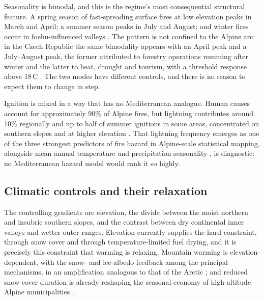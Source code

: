 \documentclass[11pt,a4paper]{article}
\begin{document}
Seasonality is bimodal, and this is the regime's most consequential structural feature. A spring season of fast-spreading surface fires at low elevation peaks in March and April; a summer season peaks in July and August; and winter fires occur in foehn-influenced valleys \citep{valese_wildfires_2011, muller_forest_2020}. The pattern is not confined to the Alpine arc: in the Czech Republic the same bimodality appears with an April peak and a July--August peak, the former attributed to forestry operations resuming after winter and the latter to heat, drought and tourism, with a threshold response above 18\,\degree C \citep{bercak_combination_2024}. The two modes have different controls, and there is no reason to expect them to change in step.

Ignition is mixed in a way that has no Mediterranean analogue. Human causes account for approximately 90\% of Alpine fires, but lightning contributes around 10\% regionally and up to half of summer ignitions in some areas, concentrated on southern slopes and at higher elevation \citep{muller_forest_2020, valese_wildfires_2011}. That lightning frequency emerges as one of the three strongest predictors of fire hazard in Alpine-scale statistical mapping, alongside mean annual temperature and precipitation seasonality \citep{gerberding_mapping_2025}, is diagnostic: no Mediterranean hazard model would rank it so highly.

\subsection{Climatic controls and their relaxation}

The controlling gradients are elevation, the divide between the moist northern and insubric southern slopes, and the contrast between dry continental inner valleys and wetter outer ranges. Elevation currently supplies the hard constraint, through snow cover and through temperature-limited fuel drying, and it is precisely this constraint that warming is relaxing. Mountain warming is elevation-dependent, with the snow- and ice-albedo feedback among the principal mechanisms, in an amplification analogous to that of the Arctic \citep{rangwala_climate_2012}; and reduced snow-cover duration is already reshaping the seasonal economy of high-altitude Alpine municipalities \citep{pede_mountain_2022}.
\end{document}
